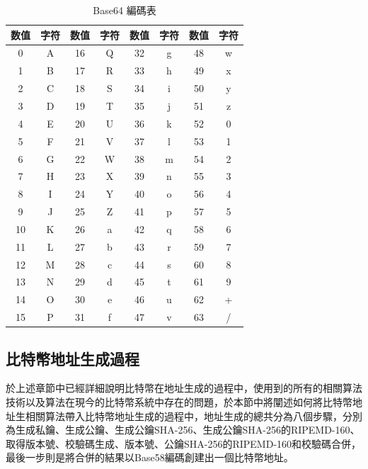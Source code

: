 					\begin{table}[htbp]
					\centering
					\caption{Base64 編碼表}
					\label{Base64}
					\begin{tabular}{|c|c|c|c|c|c|c|c|}
					\hline
					数值 & 字符 & 数值 & 字符 & 数值 & 字符 & 数值 & 字符 \\ \hline
					0 & A & 16 & Q & 32 & g & 48 & w \\ \hline
					1 & B & 17 & R & 33 & h & 49 & x \\ \hline
					2 & C & 18 & S & 34 & i & 50 & y \\ \hline
					3 & D & 19 & T & 35 & j & 51 & z \\ \hline
					4 & E & 20 & U & 36 & k & 52 & 0 \\ \hline
					5 & F & 21 & V & 37 & l & 53 & 1 \\ \hline
					6 & G & 22 & W & 38 & m & 54 & 2 \\ \hline
					7 & H & 23 & X & 39 & n & 55 & 3 \\ \hline
					8 & I & 24 & Y & 40 & o & 56 & 4 \\ \hline
					9 & J & 25 & Z & 41 & p & 57 & 5 \\ \hline
					10 & K & 26 & a & 42 & q & 58 & 6 \\ \hline
					11 & L & 27 & b & 43 & r & 59 & 7 \\ \hline
					12 & M & 28 & c & 44 & s & 60 & 8 \\ \hline
					13 & N & 29 & d & 45 & t & 61 & 9 \\ \hline
					14 & O & 30 & e & 46 & u & 62 & + \\ \hline
					15 & P & 31 & f & 47 & v & 63 & / \\ \hline
					\end{tabular}
					\end{table}
			\subsection{比特幣地址生成過程}
			於上述章節中已經詳細說明比特幣在地址生成的過程中，使用到的所有的相關算法技術以及算法在現今的比特幣系統中存在的問題，於本節中將闡述如何將比特幣地址生相關算法帶入比特幣地址生成的過程中，地址生成的總共分為八個步驟，分別為生成私鑰、生成公鑰、生成公鑰SHA-256、生成公鑰SHA-256的RIPEMD-160、取得版本號、校驗碼生成、版本號、公鑰SHA-256的RIPEMD-160和校驗碼合併，最後一步則是將合併的結果以Base58編碼創建出一個比特幣地址。

